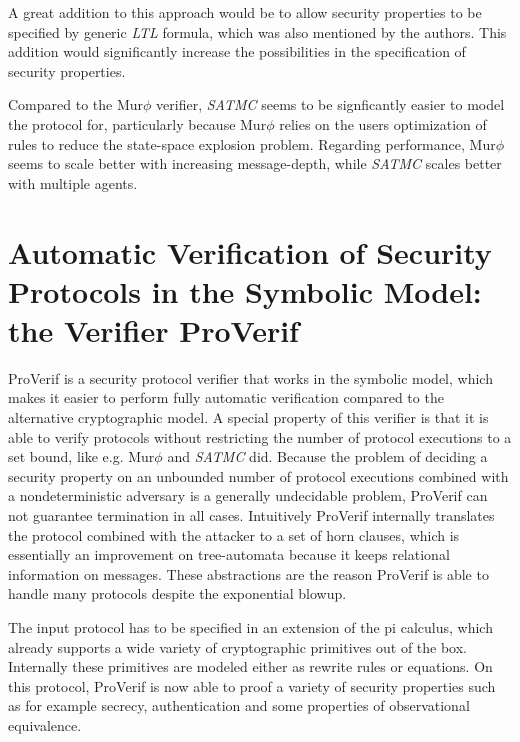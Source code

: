 \documentclass[a4paper,UKenglish]{lipics-v2018}
\def\murphi{Mur$\phi$ }
\begin{document}
A great addition to this approach would be to allow security properties to be specified by generic \textit{LTL} formula, which was also mentioned by the authors. This addition would significantly increase the possibilities in the specification of security properties.

Compared to the \murphi verifier, \textit{SATMC} seems to be signficantly easier to model the protocol for, particularly because \murphi relies on the users optimization of rules to reduce the state-space explosion problem. Regarding performance, \murphi seems to scale better with increasing message-depth, while \textit{SATMC} scales better with multiple agents.




\section{Automatic Verification of Security Protocols in the Symbolic Model: the Verifier ProVerif}

ProVerif is a security protocol verifier that works in the symbolic model, which makes it easier to perform fully automatic verification compared to the alternative cryptographic model. 
A special property of this verifier is that it is able to verify protocols without restricting the number of protocol executions to a set bound, like e.g. \murphi \cite{murphi} and \textit{SATMC}\cite{sat} did. Because the problem of deciding a security property on an unbounded number of protocol executions combined with a nondeterministic adversary is a generally undecidable problem, ProVerif can not guarantee termination in all cases. Intuitively ProVerif internally translates the protocol combined with the attacker to a set of horn clauses, which is essentially an improvement on tree-automata because it keeps relational information on messages. These abstractions are the reason ProVerif is able to handle many protocols despite the exponential blowup.\cite{ProVerif}

The input protocol has to be specified in an extension of the pi calculus, which already supports a wide variety of cryptographic primitives out of the box. Internally these primitives are modeled either as rewrite rules or equations. On this protocol, ProVerif is now able to proof a variety of security properties such as for example secrecy, authentication and some properties of observational equivalence.\cite{ProVerif}
\end{document}
